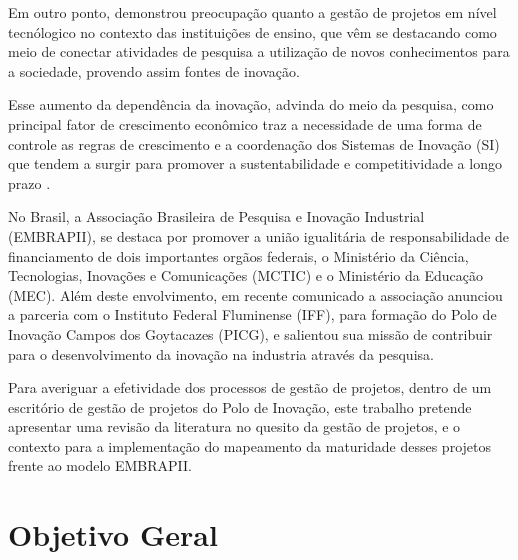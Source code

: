 Em outro ponto,  demonstrou preocupação quanto a gestão de projetos em nível tecnólogico no contexto das instituições de ensino, que vêm se destacando como meio de conectar atividades de pesquisa a utilização de novos conhecimentos para a sociedade, provendo assim fontes de inovação.

Esse aumento da dependência da inovação, advinda do meio da pesquisa, como principal fator de crescimento econômico traz a necessidade de uma forma de controle as regras de crescimento e a coordenação dos Sistemas de Inovação (SI) que tendem a surgir para promover a sustentabilidade e competitividade a longo prazo \cite{lundvall2010politicas}.

No Brasil, a Associação Brasileira de Pesquisa e Inovação Industrial (EMBRAPII), se destaca por promover a união igualitária de responsabilidade de financiamento de dois importantes orgãos federais, o Ministério da Ciência, Tecnologias, Inovações e Comunicações (MCTIC) e o Ministério da Educação (MEC). Além deste envolvimento, em recente comunicado a associação anunciou a parceria com o Instituto Federal Fluminense (IFF), para formação do Polo de Inovação Campos dos Goytacazes (PICG), e salientou sua missão de contribuir para o desenvolvimento da inovação na industria através da pesquisa.

Para averiguar a efetividade dos processos de gestão de projetos, dentro de um escritório de gestão de projetos do Polo de Inovação, este trabalho pretende apresentar uma revisão da literatura no quesito da gestão de projetos, e o contexto para a implementação do mapeamento da maturidade desses projetos frente ao modelo EMBRAPII.



\section{Objetivo Geral}

